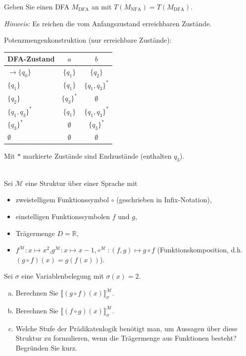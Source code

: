 Geben Sie einen DFA $M_\text{DFA}$ an mit $T(M_\text{NFA}) = T(M_\text{DFA})$.

\textit{Hinweis:} Es reichen die vom Anfangszustand erreichbaren Zustände.

\begin{loesung}
Potenzmengenkonstruktion (nur erreichbare Zustände):

\begin{center}
\begin{tabular}{l|cc}
  DFA-Zustand & $a$ & $b$ \\
  \hline
  $\to\{q_0\}$ & $\{q_1\}$ & $\{q_2\}$ \\
  $\{q_1\}$ & $\{q_1\}$ & $\{q_1,q_3\}^*$ \\
  $\{q_2\}$ & $\{q_3\}^*$ & $\emptyset$ \\
  $\{q_1,q_3\}^*$ & $\{q_1\}$ & $\{q_1,q_3\}^*$ \\
  $\{q_3\}^*$ & $\emptyset$ & $\{q_3\}^*$ \\
  $\emptyset$ & $\emptyset$ & $\emptyset$ \\
\end{tabular}
\end{center}

Mit $*$ markierte Zustände sind Endzustände (enthalten $q_3$).
\end{loesung}

\\
Sei $\mathcal{M}$ eine Struktur über einer Sprache mit
\begin{itemize}
  \item zweistelligem Funktionssymbol $\circ$ (geschrieben in Infix-Notation),
  \item einstelligen Funktionssymbolen $f$ und $g$,
  \item Trägermenge $D = \mathbb{R}$,
  \item $f^\mathcal{M}: x \mapsto x^2$,\quad $g^\mathcal{M}: x \mapsto x - 1$,\quad $\circ^\mathcal{M}: (f, g) \mapsto g \circ f$ \;(Funktionskomposition, d.h. $(g\circ f)(x)=g(f(x))$).
\end{itemize}
Sei $\sigma$ eine Variablenbelegung mit $\sigma(x) = 2$.
\begin{enumerate}[a)]
  \item Berechnen Sie $\llbracket (g \circ f)(x) \rrbracket^\mathcal{M}_\sigma$.
  \item Berechnen Sie $\llbracket (f \circ g)(x) \rrbracket^\mathcal{M}_\sigma$.
  \item Welche Stufe der Prädikatenlogik benötigt man, um Aussagen über diese Struktur zu formulieren, wenn die Trägermenge aus Funktionen besteht? Begründen Sie kurz.
\end{enumerate}

